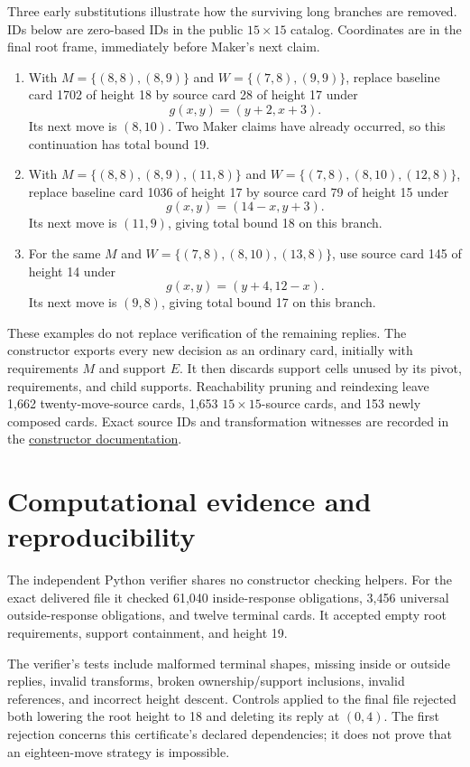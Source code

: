 \documentclass[11pt]{amsart}
\newcommand{\artifact}[2]{\href{https://github.com/shjvandekamp/math/blob/main/topics/snaky/#1}{#2}}
\begin{document}
Three early substitutions illustrate how the surviving long branches are
removed. IDs below are zero-based IDs in the public $15\times15$ catalog.
Coordinates are in the final root frame, immediately before Maker's next claim.
\begin{enumerate}
\item With $M=\{(8,8),(8,9)\}$ and $W=\{(7,8),(9,9)\}$, replace baseline
card 1702 of height 18 by source card 28 of height 17 under
\[
 g(x,y)=(y+2,x+3).
\]
Its next move is $(8,10)$. Two Maker claims have already occurred, so this
continuation has total bound 19.
\item With $M=\{(8,8),(8,9),(11,8)\}$ and
$W=\{(7,8),(8,10),(12,8)\}$, replace baseline card 1036 of height 17 by
source card 79 of height 15 under
\[
 g(x,y)=(14-x,y+3).
\]
Its next move is $(11,9)$, giving total bound 18 on this branch.
\item For the same $M$ and $W=\{(7,8),(8,10),(13,8)\}$, use source card
145 of height 14 under
\[
 g(x,y)=(y+4,12-x).
\]
Its next move is $(9,8)$, giving total bound 17 on this branch.
\end{enumerate}

These examples do not replace verification of the remaining replies. The
constructor exports every new decision as an ordinary card, initially with
requirements $M$ and support $E$. It then discards support cells unused by
its pivot, requirements, and child supports. Reachability pruning and
reindexing leave 1,662 twenty-move-source cards, 1,653 $15\times15$-source
cards, and 153 newly composed cards. Exact source IDs and transformation
witnesses are recorded in the
\artifact{constructor/README.md}{constructor documentation}.

\section{Computational evidence and reproducibility}
The independent Python verifier shares no constructor checking helpers. For
the exact delivered file it checked 61,040 inside-response obligations,
3,456 universal outside-response obligations, and twelve terminal cards.
It accepted empty root requirements, support containment, and height 19.

The verifier's tests include malformed terminal shapes, missing inside or
outside replies, invalid transforms, broken ownership/support inclusions,
invalid references, and incorrect height descent. Controls applied to the
final file rejected both lowering the root height to 18 and deleting its
reply at $(0,4)$. The first rejection concerns this certificate's declared
dependencies; it does not prove that an eighteen-move strategy is impossible.
\end{document}
